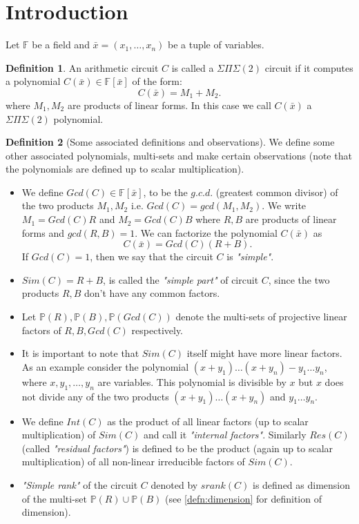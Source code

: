 \documentclass[12pt]{caltech_thesis}
\theoremstyle{plain}
\theoremstyle{definition}
\newtheorem{definition}{Definition}
\newcommand{\F}{\mathbb{F}}
\newcommand{\PP}{\mathbb{P}}
\newcommand{\B}[1]{\bar{#1}}
\begin{document}
\section{Introduction}\label{section:sps2circuit}
Let $\F$ be a field and $\B{x} = (x_1,\ldots,x_n)$ be a tuple of variables. 
\begin{definition}\label{definition:sps2circuit}
An arithmetic circuit $C$ is called a $\Sigma\Pi\Sigma(2)$ circuit if it computes a polynomial $C(\B{x})\in \F[\B{x}]$ of the form:
\[
C(\B{x}) = M_1 + M_2.
\]
where $M_1,M_2$ are products of linear forms. In this case we call $C(\B{x})$ a $\Sigma\Pi\Sigma(2)$ polynomial.
\end{definition}


\begin{definition}[Some associated definitions and observations]\label{definition:definitionsandobservations} We define some 
other associated polynomials, multi-sets and make certain observations (note that the polynomials are defined up to scalar multiplication).

\begin{itemize}
\renewcommand\labelitemi{--}
\item We define $Gcd(C)\in \F[\B{x}]$, to be the $g.c.d.$ (greatest common divisor) of the two products 
$M_1,M_2$ i.e. $Gcd(C) = gcd(M_1,M_2)$. We write $M_1 = Gcd(C)R$ and $M_2 = Gcd(C)B$ where $R,B$ are products of linear forms
and $gcd(R,B)=1$. We can factorize the polynomial $C(\B{x})$ as
 \begin{equation} \label{equation:factorize}
C(\B{x}) = Gcd(C)(R+B).
\end{equation}
If $Gcd(C)=1$, then we say that the circuit $C$ is \emph{"simple"}.
\item $Sim(C) = R+B$, is called the \emph{"simple part"} of circuit $C$, since the two products $R,B$ don't have 
any   common factors.

\item Let $\PP(R), \PP(B),\PP(Gcd(C))$ denote the multi-sets of   projective linear factors of $R,B,Gcd(C)$ respectively. 

\item It is important to note that $Sim(C)$ itself might have more   linear factors. As an example consider the polynomial $(x+y_1)\ldots (x+y_n) - y_1\ldots y_n$,
where $x,y_1,\ldots,y_n$ are variables. This polynomial is divisible by $x$ but $x$ does not divide any of the two products 
$(x+y_1)\ldots (x+y_n)$ and $y_1\ldots y_n$.

\item We define $Int(C)$ as the product of all   linear factors (up to scalar multiplication) of $Sim(C)$ and call it \emph{"internal factors"}. 
Similarly $Res(C)$ (called \emph{"residual factors"})
is defined to be the product (again up to scalar multiplication) of all non-linear irreducible factors of $Sim(C)$.
\item \emph{"Simple rank"} of the circuit $C$ denoted by $srank(C)$ is defined as dimension of the multi-set $\PP(R)\cup\PP(B)$ (see \ref{defn:dimension}
for definition of dimension). 


\end{itemize}
\end{definition}
\end{document}
